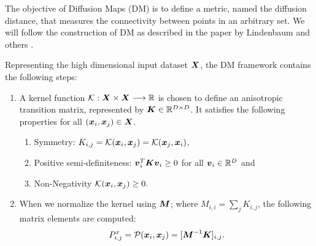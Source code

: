 The objective of Diffusion Maps (DM) is to define a metric, named the diffusion distance, that measures the connectivity between points in an arbitrary set. We will follow the construction of DM as described
in the paper by Lindenbaum and others \citep{Lind2015}.

Representing the high dimensional input dataset \begin{math} {\mbox{\boldmath $X$}} \end{math}, the DM framework contains the following steps:

\begin{enumerate}

\item A kernel function  \begin{math}{{\cal{K}} : {\mbox{\boldmath $X$}}\times{{\mbox{\boldmath $X$}}}\longrightarrow{\mathbb{R}}  }
	\end{math} is chosen to define an anisotropic transition matrix, represented by ${\mbox{\boldmath $K$}} \in {\mathbb{R}^{D \times D}}$. It satisfies the following properties for all 
	\begin{math}{({\mbox{\boldmath $x$}}_i,{\mbox{\boldmath $x$}}_j) \in {{\mbox{\boldmath $X$}}} }
	\end{math}.
	
	\begin{enumerate}
	
     \item Symmetry: \begin{math}{K_{i,j}={\cal{K}}({\mbox{\boldmath $x$}}_i,{\mbox{\boldmath $x$}}_j)={\cal{K}}({\mbox{\boldmath $x$}}_j,{\mbox{\boldmath $x$}}_i) }
	\end{math}, 
	
	\item Positive semi-definiteness: \begin{math}{ {\mbox{\boldmath $v$}}_i^T  {\mbox{\boldmath $K$}}  {\mbox{\boldmath $v$}}_i \geq 0 }\end{math} for all ${\mbox{\boldmath $v$}}_i \in
	\mathbb{R}^D$ and 
	
	\item Non-Negativity \begin{math}{{\cal{K}}({\mbox{\boldmath $x$}}_i,{\mbox{\boldmath $x$}}_j)
		\geq 0. }
	\end{math}
	\end{enumerate}
	
\item {When we normalize the kernel using  ${\mbox{\boldmath $M$}}$; where  \begin{math} M_{i,i}=\underset{j}{\sum}{K_{i,j}} \end{math}, the following matrix elements are computed:  
\begin{equation}
		{P_{i,j}^x={\cal{P}}(\myvec{x}_i,\myvec{x}_j)=[{{\mymat{M}}^{-1}{\mymat{K}}  }}]_{i,j}
		\label{EquationPDM}
		.\end{equation}
		
}
\end{enumerate}
